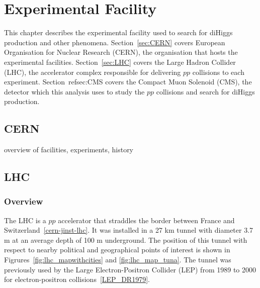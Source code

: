 
\chapter{Experimental Facility\label{ch:experiment}}

This chapter describes the experimental facility used to search for diHiggs production and other phenomena. Section~\ref{sec:CERN} covers European Organisation for Nuclear Research (CERN), the organisation
that hosts the experimental facilities. Section~\ref{sec:LHC} covers the Large Hadron Collider (LHC), the accelerator complex responsible for delivering $pp$ collisions to each experiment. Section~ref{sec:CMS}
covers the Compact Muon Solenoid (CMS), the detector which this analysis uses to study the $pp$ collisions and search for diHiggs production.


\section{CERN\label{sec:CERN}}
overview of facilities, experiments, history

\section{LHC\label{sec:LHC}}
\subsection{Overview}
The LHC is a $pp$ accelerator that straddles the border between France and Switzerland~\ref{cern-jinst-lhc}. It was installed in a 27 km tunnel with diameter 3.7 m at an average depth of 100 m underground.
The position of this tunnel with respect to nearby political and geographical points of interest is 
shown in Figrures~\ref{fig:lhc_mapwithcities} and \ref{fig:lhc_map_tuna}.
The tunnel was previously
used by the Large Electron-Positron Collider (LEP) from 1989 to 2000 for electron-positron collisions~\ref{LEP_DR1979}.

